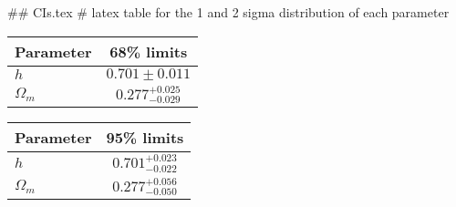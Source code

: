 ## CIs.tex
# latex table for the 1 and 2 sigma distribution of each parameter

\begin{tabular} { l  c}
 Parameter &  68\% limits\\
\hline
{\boldmath$h              $} & $0.701\pm 0.011            $\\
{\boldmath$\Omega_m       $} & $0.277^{+0.025}_{-0.029}   $\\
\hline
\end{tabular}

\begin{tabular} { l  c}
 Parameter &  95\% limits\\
\hline
{\boldmath$h              $} & $0.701^{+0.023}_{-0.022}   $\\
{\boldmath$\Omega_m       $} & $0.277^{+0.056}_{-0.050}   $\\
\hline
\end{tabular}
